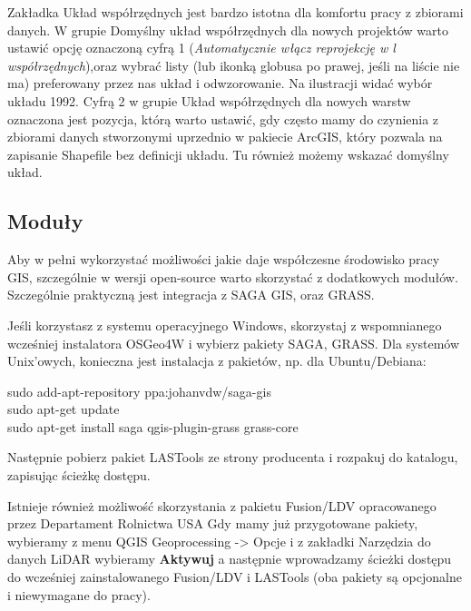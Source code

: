 \documentclass[12pt,a4paper]{book}
\begin{document}
Zakładka Układ współrzędnych jest bardzo istotna dla komfortu pracy z zbiorami danych. W grupie Domyślny układ współrzędnych dla nowych projektów warto ustawić opcję oznaczoną cyfrą 1 (\textit{Automatycznie włącz reprojekcję w l} \textit{współrzędnych}),oraz wybrać listy (lub ikonką globusa po prawej, jeśli na liście nie ma) preferowany przez nas układ i odwzorowanie. Na ilustracji widać wybór układu 1992. Cyfrą 2 w grupie Układ współrzędnych dla nowych warstw oznaczona jest pozycja, którą warto ustawić, gdy często mamy do czynienia z zbiorami danych stworzonymi uprzednio w pakiecie ArcGIS, który pozwala na zapisanie Shapefile bez definicji układu. Tu również możemy wskazać domyślny układ.

\subsection{Moduły}
Aby w pełni wykorzystać możliwości jakie daje współczesne środowisko pracy GIS, szczególnie w wersji open-source warto skorzystać z dodatkowych modułów. Szczególnie praktyczną jest integracja z SAGA GIS, oraz GRASS.

Jeśli korzystasz z systemu operacyjnego Windows, skorzystaj z wspomnianego wcześniej instalatora OSGeo4W i wybierz pakiety SAGA, GRASS. Dla systemów Unix'owych, konieczna jest instalacja z pakietów, np. dla Ubuntu/Debiana:

\begin{center}
sudo add-apt-repository ppa:johanvdw/saga-gis 
\\sudo apt-get update
\\sudo apt-get install saga qgis-plugin-grass grass-core
\end{center}
Następnie pobierz pakiet LASTools ze strony producenta \cite{lastools} i rozpakuj do katalogu, zapisując ścieżkę dostępu.

Istnieje również możliwość skorzystania z pakietu Fusion/LDV opracowanego przez Departament Rolnictwa USA \cite{fusion} Gdy mamy już przygotowane pakiety, wybieramy z menu QGIS Geoprocessing -{\textgreater} Opcje i z zakładki Narzędzia do danych LiDAR wybieramy \textbf{Aktywuj }a następnie wprowadzamy ścieżki dostępu do wcześniej zainstalowanego Fusion/LDV i LASTools (oba pakiety są opcjonalne i niewymagane do pracy).
\end{document}
